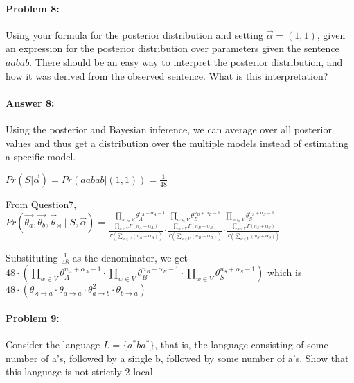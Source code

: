 \documentclass[10pt]{article}
\begin{document}
\noindent\hrulefill %

\paragraph{Problem 8:}

Using your formula for the posterior distribution and setting
$\vec{\alpha} = (1,1)$, given an expression for the posterior
distribution over parameters given the sentence $aabab$. There should
be an easy way to interpret the posterior distribution, and how it was
derived from the observed sentence. What is this interpretation?

\paragraph{Answer 8:} Using the posterior and Bayesian inference, we can average over all posterior values and thus get a distribution over the multiple models instead of estimating a specific model.

$Pr(S|\vec{\alpha})=Pr(aabab|(1,1))=\frac{1}{48}$

From Question7, $Pr(\vec{\theta_a}, \vec{\theta_b}, \vec{\theta}_{\rtimes} \mid S,\vec{\alpha})=\frac{\prod_{w \in V} \theta_{A}^{n_A+\alpha_{A}-1}\cdot{\prod_{w \in V} \theta_{B}^{n_B+\alpha_{B}-1}\cdot{\prod_{w \in V} \theta_{S}^{n_S+\alpha_{S}-1}}}}{\frac{\prod_{w \in V} \Gamma(n_A+\alpha_{A})}{\Gamma(\sum_{w \in V} (n_A+\alpha_{A}))}\cdot{\frac{\prod_{w \in V} \Gamma(n_B+\alpha_{B})}{\Gamma(\sum_{w \in V} (n_B+\alpha_{B}))}\cdot{\frac{\prod_{w \in V} \Gamma(n_S+\alpha_{S})}{\Gamma(\sum_{w \in V} (n_S+\alpha_{S}))}}}}$

Substituting $\frac{1}{48}$ as the denominator, we get $48 \cdot{\left(\prod_{w \in V} \theta_{A}^{n_A+\alpha_{A}-1}\cdot{\prod_{w \in V} \theta_{B}^{n_B+\alpha_{B}-1}\cdot{\prod_{w \in V} \theta_{S}^{n_S+\alpha_{S}-1}}}\right)}$ which is $48\cdot{(\theta_{\rtimes \rightarrow a}\cdot{\theta_{a \rightarrow a}\cdot{\theta_{a \rightarrow b}^2\cdot{\theta_{b \rightarrow a}}}})}$


\noindent\hrulefill %

\paragraph{Problem 9:}

Consider the language $L=\{a^* b a^*\}$, that is, the language
consisting of some number of a's, followed by a single b, followed by
some number of a's. Show that this language is not strictly
$2$-local.\\
\end{document}
